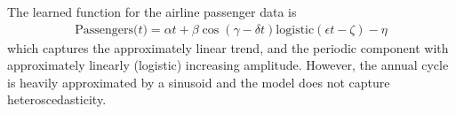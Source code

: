 The learned function for the airline passenger data is
\begin{align*}
\textrm{Passengers($t$)} = \alpha t + \beta\cos(\gamma - \delta t)\textrm{logistic}(\epsilon t - \zeta) - \eta
\end{align*}
which captures the approximately linear trend, and the periodic component with approximately linearly (logistic) increasing amplitude.
However, the annual cycle is heavily approximated by a sinusoid and the model does not capture heteroscedasticity.

\fi
